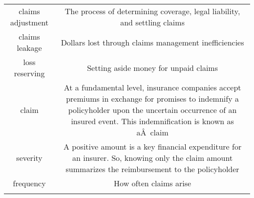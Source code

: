 \documentclass[]{book}
\theoremstyle{definition}
\theoremstyle{definition}
\theoremstyle{definition}
\theoremstyle{remark}
\begin{document}
\begin{longtable}[]{@{}cc@{}}
\begin{minipage}[t]{0.41\columnwidth}\centering\strut
claims adjustment\strut
\end{minipage} & \begin{minipage}[t]{0.42\columnwidth}\centering\strut
The process of determining coverage, legal liability, and settling
claims\strut
\end{minipage}\tabularnewline
\begin{minipage}[t]{0.41\columnwidth}\centering\strut
claims leakage\strut
\end{minipage} & \begin{minipage}[t]{0.42\columnwidth}\centering\strut
Dollars lost through claims management inefficiencies\strut
\end{minipage}\tabularnewline
\begin{minipage}[t]{0.41\columnwidth}\centering\strut
loss reserving\strut
\end{minipage} & \begin{minipage}[t]{0.42\columnwidth}\centering\strut
Setting aside money for unpaid claims\strut
\end{minipage}\tabularnewline
\begin{minipage}[t]{0.41\columnwidth}\centering\strut
claim\strut
\end{minipage} & \begin{minipage}[t]{0.42\columnwidth}\centering\strut
At a fundamental level, insurance companies accept premiums in exchange
for promises to indemnify a policyholder upon the uncertain occurrence
of an insured event. This indemnification is known as aÂ~claim\strut
\end{minipage}\tabularnewline
\begin{minipage}[t]{0.41\columnwidth}\centering\strut
severity\strut
\end{minipage} & \begin{minipage}[t]{0.42\columnwidth}\centering\strut
A positive amount is a key financial expenditure for an insurer. So,
knowing only the claim amount summarizes the reimbursement to the
policyholder\strut
\end{minipage}\tabularnewline
\begin{minipage}[t]{0.41\columnwidth}\centering\strut
frequency\strut
\end{minipage} & \begin{minipage}[t]{0.42\columnwidth}\centering\strut
How often claims arise\strut
\end{minipage}\tabularnewline
\begin{minipage}[t]{0.41\columnwidth}\centering\strut

\end{minipage}
\end{longtable}
\end{document}
